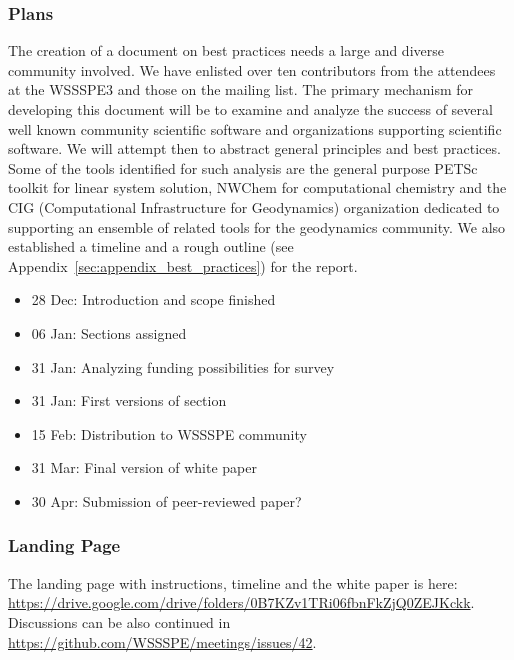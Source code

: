 \subsubsection{Plans}
The creation of a document on best practices needs a large and diverse community
involved. We have enlisted over ten contributors from the attendees at the
WSSSPE3 and those on the mailing list. The primary mechanism for developing this
document will be to examine and analyze the success of several well known
community scientific software and organizations supporting scientific software.
We will attempt then to abstract general principles and best practices. Some of
the tools identified for such analysis are the general purpose PETSc toolkit for
linear system solution, NWChem for computational chemistry and the CIG
(Computational Infrastructure for Geodynamics) organization dedicated to
supporting an ensemble of related tools for the geodynamics community. We also
established a timeline and a rough outline (see
Appendix~\ref{sec:appendix_best_practices}) for the report.

\medskip
{}
\begin{itemize}
%
\item 28 Dec: Introduction and scope finished
\item 06 Jan: Sections assigned
\item 31 Jan: Analyzing funding possibilities for survey
\item 31 Jan: First versions of section
\item 15 Feb: Distribution to WSSSPE community
\item 31 Mar: Final version of white paper
\item 30 Apr: Submission of peer-reviewed paper?
\end{itemize}


\subsubsection{Landing Page}
The landing page with instructions, timeline and the white paper is here: \url{https://drive.google.com/drive/folders/0B7KZv1TRi06fbnFkZjQ0ZEJKckk}.
Discussions can be also continued in \url{https://github.com/WSSSPE/meetings/issues/42}.
